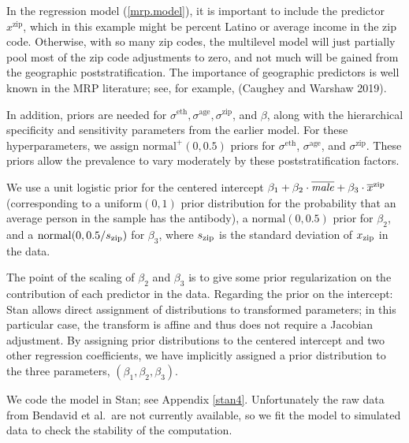 \documentclass[11pt]{article}
\begin{document}
In the regression model (\ref{mrp.model}), it is important to include
the predictor $x^{\textrm{zip}}$, which in this example might be
percent Latino or average income in the zip code.  Otherwise, with so
many zip codes, the multilevel model will just partially pool most of
the zip code adjustments to zero, and not much will be gained from the
geographic poststratification.  The importance of geographic
predictors is well known in the MRP literature; see, for example,
(Caughey and Warshaw 2019).

In addition, priors are needed for
$\sigma^{\textrm{eth}}, \sigma^{\textrm{age}}, \sigma^{\textrm{zip}}$,
and $\beta$, along with the hierarchical specificity and sensitivity
parameters from the earlier model.  
For these hyperparameters, we assign $\mbox{normal}^+(0, 0.5)$ priors for
$\sigma^{\textrm{eth}}$, $\sigma^{\textrm{age}}$, and
$\sigma^{\textrm{zip}}$.  These priors allow the prevalence to vary
moderately by these poststratification factors.

We use a unit logistic prior for the centered
intercept
$\beta_1 + \beta_2 \cdot \overline{\it male} + \beta_3 \cdot \overline{x}^{\rm zip}$
(corresponding to a $\mbox{uniform}(0,1)$ prior distribution for the probability that an average person in the
sample has the antibody), a $\mbox{normal}(0,0.5)$ prior for
$\beta_2$, and a $\mbox{normal}(0, 0.5/s_{\rm zip})$ for $\beta_3$, where $s_{\rm zip}$ is the standard deviation of $x_{\rm zip}$ in the data.

The point of the scaling of $\beta_2$ and $\beta_3$ is to give some prior regularization on the contribution of each predictor in the data.  Regarding the prior on the intercept:
Stan allows direct assignment of distributions to
  transformed parameters; in this particular case, the transform is
  affine and thus does not require a Jacobian adjustment.  By assigning prior distributions to the centered intercept and two other regression coefficients, we have implicitly assigned a prior distribution to the three parameters, $(\beta_1,\beta_2,\beta_3)$.

We code the model in Stan; see Appendix \ref{stan4}.  
 Unfortunately
the raw data from Bendavid et al.\ are not currently available, so we
fit the model to simulated data to check the stability of the
computation.
\end{document}
